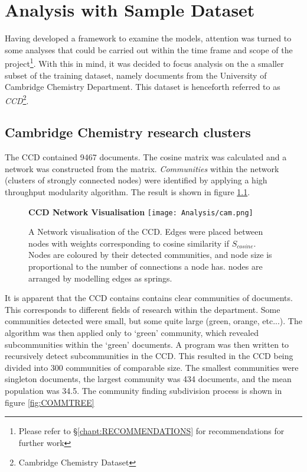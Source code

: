 \chapter{Analysis with Sample Dataset}
Having developed a framework to examine the models, attention was turned to some analyses that could be carried out within the time frame and scope of the project\footnote{Please refer to  \S\ref{chapt:RECOMMENDATIONS} for recommendations for further work}. With this in mind, it was decided to focus analysis on the a smaller subset of the training dataset, namely documents from the University of Cambridge Chemistry Department. This dataset is henceforth referred to as \emph{CCD}\footnote{Cambridge Chemistry Dataset}.
\section{Cambridge Chemistry research clusters}
\label{sec:RESEARCHCLUSTERS}
The CCD contained 9467 documents. The cosine matrix was calculated and a network was constructed from the matrix. \emph{Communities} within the network (clusters of strongly connected nodes) were identified by applying a high throughput modularity algorithm\cite{modularity1}\cite{modularity2}. The result is shown in figure \ref{fig:CAMCOMMUNITIES}.
\begin{center}
\begin{figure}[H]
  \centering
  \textbf{CCD Network Visualisation}
    \texttt{[image: Analysis/cam.png]}
    \caption[Network Visualisation of University of Cambridge Chemistry Department Documents]{A Network visualisation of the CCD. Edges were placed between nodes with weights corresponding to cosine similarity if $S_{cosine}$. Nodes are coloured by their detected communities, and node size is proportional to the number of connections a node has. nodes are arranged by modelling edges as springs.}
    \label{fig:CAMCOMMUNITIES}

\end{figure} 
\end{center}
It is apparent that the CCD contains contains clear communities of documents. This corresponds to different fields of research within the department. Some communities detected were small, but some quite large (green, orange, etc...). The algorithm was then applied only to `green' community, which revealed subcommunities within the `green' documents. A program was then written to recursively detect subcommunities in the CCD. This resulted in the CCD being divided into 300 communities of comparable size. The smallest communities were singleton documents, the largest community was 434 documents, and the mean population was 34.5. The community finding subdivision process is shown in figure \ref{fig:COMMTREE}
